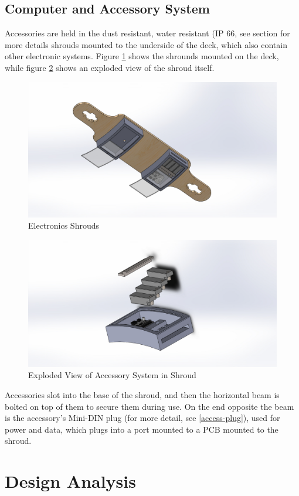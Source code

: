 \documentclass[titlepage, letterpaper,12pt]{article}
\begin{document}
\subsection{Computer and Accessory System}
Accessories are held in the dust resistant, water resistant (IP 66, see section for more details shrouds mounted to the underside of the deck, which also contain other electronic systems. Figure \ref{access-full} shows the shrounds mounted on the deck, while figure \ref{access-expl} shows an exploded view of the shroud itself.
\begin{figure}\centering
  \includegraphics[width=.7\linewidth]{ModularAssembledBottomAngle}
  \caption{Electronics Shrouds}
  \label{access-full}
\end{figure}
\begin{figure}\centering
  \includegraphics[width=.7\linewidth]{ModPieceAngleExtend}
  \caption{Exploded View of Accessory System in Shroud}
  \label{access-expl}
\end{figure}
Accessories slot into the base of the shroud, and then the horizontal beam is bolted on top of them to secure them during use. On the end opposite the beam is the accessory's Mini-DIN plug (for more detail, see \ref{access-plug}), used for power and data, which plugs into a port mounted to a PCB mounted to the shroud.

\section{Design Analysis}
\end{document}
